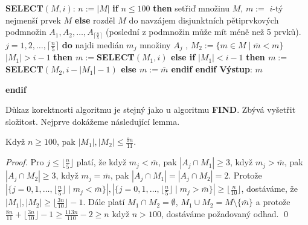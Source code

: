 \documentclass[a4paper,12pt]{article}
\begin{document}
{\bf SELECT$(M,i)$}:\newline 
$n:=|M|$\newline 
{\bf if} $n\le 100$ {\bf then\newline 
\phantom{{\rm---}}}setři\v d množinu $M$, $m:=$ $i$-tý nejmenší 
prvek $M$\newline 
{\bf else\newline 
\phantom{{\rm---}}}rozděl $M$ do navzájem disjunktních 
pětiprvkových podmnožin $A_1,A_2,\dots,A_{\lceil\frac n5\rceil}$\newline 
\phantom{---}(poslední z podmnožin může mít méně než 5 prvků).\newline 
\phantom{---}{\bf for every} $j=1,2,\dots,\lceil\frac n5\rceil$ {\bf do\newline 
\phantom{{\rm------}}}najdi medián $m_j$ množiny $A_j$\newline 
{}, $M_2:=\{m\in 
M\mid\bar {m}<m\}$\newline 
\phantom{---}{\bf if} $|M_1|>i-1$ {\bf then\newline 
\phantom{{\rm ------}}$m:=$SELECT$(M_1,i)$\newline 
\phantom{{\rm ---}}else\newline 
\phantom{{\rm------}}if} $|M_1|<i-1$ {\bf then\newline 
\phantom{{\rm ---------}}$m:=$SELECT$(M_2,i-|M_1|-1)$\newline 
\phantom{{\rm ------}}else\newline 
\phantom{{\rm ---------}}$m:=\bar {m}$\newline 
\phantom{{\rm ------}}endif\newline 
\phantom{{\rm ---}}endif\newline 
\phantom{{\rm ---}}Výstup}: $m$\newline 
{\bf endif

}
Důkaz korektnosti algoritmu je stejný 
jako u algoritmu {\bf FIND}. 
Zbývá vyšetřit složitost. Nej\-prve dokážeme následující 
lemma.

\begin{lemma}Když $n\ge 100$, pak $|M_1|,|M_2|\le\frac {8n}{
11}$.
\end{lemma}

\begin{proof} Pro $j\le\lfloor\frac n5\rfloor$ platí, že když $
m_j<\bar {m}$, pak 
$|A_j\cap M_1|\ge 3$, když $m_j>\bar {m}$, pak $|A_j\cap M_2|\ge 
3$, když $m_j=\bar {m}$, 
pak $|A_j\cap M_1|=|A_j\cap M_2|=2$.  Protože 
$|\{j=0,1,\dots,\lfloor\frac n5\rfloor\mid m_j<\bar {m}\}|,|\{j=0
,1,\dots,\lfloor\frac n5\rfloor\mid m_j>\bar {m}\}|\ge\lfloor\frac 
n{10}\rfloor$, 
dostáváme, že $|M_1|,|M_2|\ge\lfloor\frac {3n}{10}\rfloor 
-1$.  Dále platí $M_1\cap M_2=\emptyset$, 
$M_1\cup M_2=M\setminus \{\bar {m}\}$ a protože $\frac {8n}{11}
+\lfloor\frac {3n}{10}\rfloor -1\ge\frac {113n}{110}-2\ge n$ 
když $n>100$, dostáváme požadovaný odhad. \qed
\end{proof}
\end{document}
